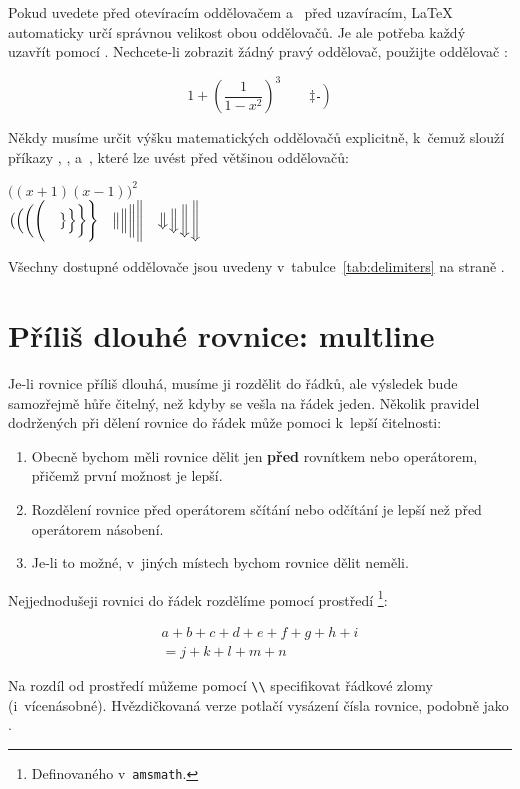 Pokud uvedete  před otevíracím oddělovačem a~
před uzavíracím, \LaTeX{} automaticky určí správnou velikost obou
oddělovačů. Je ale potřeba každý  uzavřít pomocí .
Nechcete-li zobrazit žádný pravý oddělovač, použijte 
oddělovač :
\begin{example}
\begin{equation*}
1 + \left(\frac{1}{1-x^{2}}
    \right)^3 \qquad 
\left. \ddagger \frac{~}{~}
\right)
\end{equation*}
\end{example}

Někdy musíme určit výšku matematických oddělovačů
explicitně, k~čemuž slouží příkazy , ,  a~,
které lze uvést před většinou oddělovačů:
\begin{example}
$\Big((x+1)(x-1)\Big)^{2}$\\
$\big( \Big( \bigg( \Bigg( \quad
\big\} \Big\} \bigg\} \Bigg\}
\quad
\big\| \Big\| \bigg\| \Bigg\|
\quad
\big\Downarrow \Big\Downarrow 
\bigg\Downarrow \Bigg\Downarrow$
\end{example}
Všechny dostupné oddělovače jsou uvedeny v~tabulce~\ref{tab:delimiters} na straně
\pageref{tab:delimiters}. 


\section{Příliš dlouhé rovnice: multline}
\label{sec:multline}

Je-li rovnice příliš dlouhá, musíme ji rozdělit do řádků, ale
výsledek bude samozřejmě hůře čitelný, než kdyby se vešla na řádek jeden.
Několik pravidel dodržených při dělení rovnice do řádek může pomoci k~lepší
čitelnosti:
\begin{enumerate}
\item Obecně bychom měli rovnice dělit jen \textbf{před} rovnítkem nebo
  operátorem, přičemž první možnost je lepší.
\item Rozdělení rovnice před operátorem sčítání nebo odčítání je lepší než
  před operátorem násobení.
\item Je-li to možné, v~jiných místech bychom rovnice dělit neměli.
\end{enumerate}
Nejjednodušeji rovnici do řádek rozdělíme pomocí prostředí %
\footnote{Definovaného v~\texttt{amsmath}.}:
\begin{example}
\begin{multline}
  a + b + c + d + e + f 
    + g + h + i\\
  = j + k + l + m + n 
\end{multline}
\end{example}
\noindent
Na rozdíl od prostředí  můžeme pomocí \verb+\\+ specifikovat
řádkové zlomy (i~vícenásobné). Hvězdičkovaná verze  potlačí
vysázení čísla rovnice, podobně jako .


